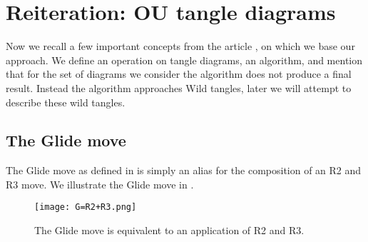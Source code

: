 \section{Reiteration: OU tangle diagrams}

Now we recall a few important concepts from the article \citep{barnatan2020tangles}, on which we base our approach. We define an operation on tangle diagrams, an algorithm, and mention that for the set of diagrams we consider the algorithm does not produce a final result. Instead the algorithm approaches Wild tangles, later we will attempt to describe these wild tangles.

\subsection{The Glide move}

The Glide move as defined in \citep{barnatan2020tangles} is simply an alias for the composition of an R2 and R3 move. We illustrate the Glide move in .

\begin{figure}[h!]
\centering
\texttt{[image: G=R2+R3.png]}
\caption{The Glide move is equivalent to an application of R2 and R3.}
\label{fig:GR2R3}
\end{figure}

